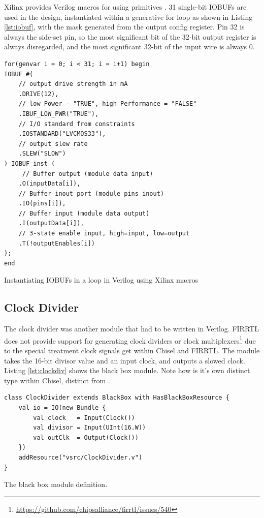 Xilinx provides Verilog macros for using primitives \cite{vivado_libs}. 31 single-bit IOBUFs are used in the design, instantiated within a generative for loop as shown in Listing \ref{lst:iobuf}, with the  mask generated from the output config register. Pin 32 is always the side-set pin, so the most significant bit of the 32-bit output register is always disregarded, and the most significant 32-bit of the input wire is always 0.

\begin{listing}[h!]
    \vspace{0.5cm}
    \begin{verbatim}
for(genvar i = 0; i < 31; i = i+1) begin
IOBUF #( 
    // output drive strength in mA
    .DRIVE(12), 
    // low Power - "TRUE", high Performance = "FALSE"
    .IBUF_LOW_PWR("TRUE"),  
    // I/O standard from constraints
    .IOSTANDARD("LVCMOS33"),
    // output slew rate 
    .SLEW("SLOW") 
) IOBUF_inst (
     // Buffer output (module data input)
    .O(inputData[i]),
    // Buffer inout port (module pins inout)     
    .IO(pins[i]),   
    // Buffer input (module data output)
    .I(outputData[i]),     
    // 3-state enable input, high=input, low=output
    .T(!outputEnables[i])     
);
end
    \end{verbatim}
    \caption{Instantiating IOBUFs in a loop in Verilog using Xilinx macros \cite{vivado_libs}}
    \label{lst:iobuf}
\end{listing}

\subsection{Clock Divider}

The clock divider was another module that had to be written in Verilog. FIRRTL does not provide support for generating clock dividers or clock multiplexers\footnote{\url{https://github.com/chipsalliance/firrtl/issues/540}} due to the special treatment clock signals get within Chisel and FIRRTL. The module takes the 16-bit divisor value and an input clock, and outputs a slowed clock. Listing \ref{lst:clockdiv} shows the black box module. Note how  is it's own distinct type within Chisel, distinct from .

\begin{listing}[h!]
    \centering
    \vspace{0.5cm}
    \begin{verbatim}
class ClockDivider extends BlackBox with HasBlackBoxResource {
    val io = IO(new Bundle {
        val clock   = Input(Clock())
        val divisor = Input(UInt(16.W))
        val outClk  = Output(Clock())
    })
    addResource("vsrc/ClockDivider.v")
}
    \end{verbatim}
    \caption{The  black box module definition.}
    \label{lst:clockdiv}
\end{listing}

